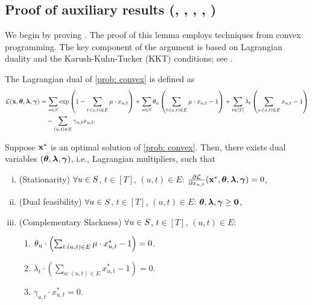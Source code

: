 {\subsection{Proof of auxiliary results (, , , , )}
\label{ssec: auxiliary results}

We begin by proving . The proof of this lemma employs techniques from convex programming. The key component of the argument is based on Lagrangian duality and the Karush-Kuhn-Tucker (KKT) conditions; see \citep{boyd2004convex}.  

\begin{definition}
    The Lagrangian dual of \ref{prob: convex} is defined as
    \begin{align*}
    \mathcal{L}(\mathbf{x}, \bm{\theta}, \bm{\lambda}, \bm{\gamma}) &= \sum_{u \in S}{ \exp\left( 1- \sum_{t: (u, t) \in E} \mu \cdot x_{u, t} \right)} + \sum_{u \in S} \theta_u \left( \sum_{t:(u,t) \in E} \mu\cdot x_{u,t} - 1\right) + \sum_{t \in [T]} \lambda_t \left( \sum_{u: (u,t) \in E} x_{u,t} - 1 \right) \\
    & \quad - \sum_{(u,t) \in E} \gamma_{u,t} x_{u,t}.
    \end{align*}
\end{definition}
\begin{proposition}
    \label{prop_cite: KKT}
     Suppose $\mathbf{x}^*$ is {an} optimal solution of \ref{prob: convex}. Then, there exists dual variables $(\bm{\theta}, \bm{\lambda}, \bm{\gamma})$, i.e., Lagrangian multipliers, such that 
    \begin{enumerate}[(i)]
        \item (Stationarity) $\forall u \in S$, $t \in [T]$, $(u,t) \in E$: $\frac{\partial \mathcal L}{\partial x_{u,t}}(\mathbf{x}^*, \bm{\theta}, \bm{\lambda}, \bm{\gamma}) = 0$,
        \item (Dual feasibility) $\forall u \in S$, $t \in [T]$, $(u,t) \in E$: $\bm{\theta}, \bm{\lambda}, \bm{\gamma} \geq \mathbf{0}$,
        \item (Complementary Slackness) $\forall u \in S$, $t \in [T]$, $(u,t) \in E$:
        \begin{enumerate}
            \item $\theta_u \cdot \left( \sum_{t:(u,t) \in E} \mu\cdot x_{u,t}^* - 1\right) = 0$.
            \item $\lambda_t \cdot \left( \sum_{u: (u,t) \in E} x_{u,t}^* - 1 \right) = 0$.
            \item $\gamma_{u,t} \cdot x_{u,t}^* = 0$.
        \end{enumerate}
    \end{enumerate}
\end{proposition}

}

